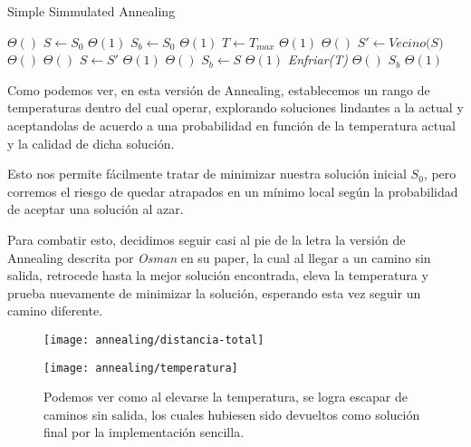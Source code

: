 \begin{algorithm}[H]
\caption{Simple Simmulated Annealing}
\begin{algorithmic}[1]
 \Comment $\Theta()$
\State $S \gets S_0$ \Comment $\Theta(1)$
\State $S_b \gets S_0$ \Comment $\Theta(1)$
\State $T \gets T_{max}$ \Comment $\Theta(1)$
\State
{} \Comment $\Theta()$
	\State $S' \gets \textit{Vecino(S)}$ \Comment $\Theta()$
	 \Comment $\Theta()$
		\State $S \gets S'$ \Comment $\Theta(1)$
	\EndIf	
	\State
	 \Comment $\Theta()$
		\State $S_b \gets S$ \Comment $\Theta(1)$
	\EndIf	
	\State \textit{Enfriar(T)} \Comment $\Theta()$
\EndWhile
\State
\State \Return $S_b$ \Comment $\Theta(1)$
\EndFunction
\end{algorithmic}
\end{algorithm}

Como podemos ver, en esta versión de Annealing, establecemos un rango de temperaturas dentro del cual operar, explorando soluciones lindantes a la actual y aceptandolas de acuerdo a una probabilidad en función de la temperatura actual y la calidad de dicha solución.


Esto nos permite fácilmente tratar de minimizar nuestra solución inicial $S_0$, pero corremos el riesgo de quedar atrapados en un mínimo local según la probabilidad de aceptar una solución al azar.

Para combatir esto, decidimos seguir casi al pie de la letra la versión de Annealing descrita por \textit{Osman} en su paper, la cual al llegar a un camino sin salida, retrocede hasta la mejor solución encontrada, eleva la temperatura y prueba nuevamente de minimizar la solución, esperando esta vez seguir un camino diferente.


\begin{figure}[H]
	\centering
	\begin{minipage}[t]{.45\textwidth}
		\centering
		\texttt{[image: annealing/distancia-total]}
	\end{minipage}\qquad
	\begin{minipage}[t]{.45\textwidth}
		\centering
		\texttt{[image: annealing/temperatura]}
	\end{minipage}
	
	Podemos ver como al elevarse la temperatura, se logra escapar de caminos sin salida, los cuales hubiesen sido devueltos como solución final por la implementación sencilla.
\end{figure}	


